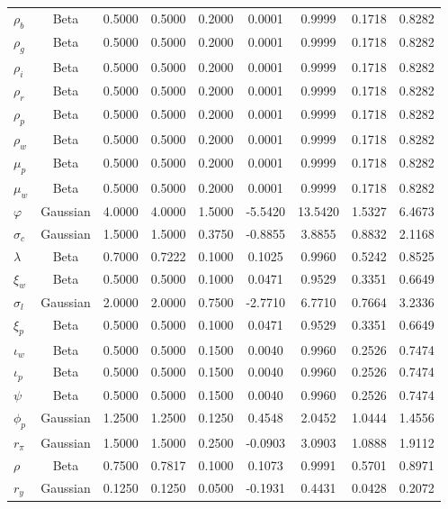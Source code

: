 \begin{center}
\begin{longtable}{lcccccccc}
$ {\rho_b} $ & Beta & 0.5000 & 0.5000 & 0.2000 & 0.0001 & 0.9999 & 0.1718 & 0.8282 \\ 
$ {\rho_g} $ & Beta & 0.5000 & 0.5000 & 0.2000 & 0.0001 & 0.9999 & 0.1718 & 0.8282 \\ 
$ {\rho_i} $ & Beta & 0.5000 & 0.5000 & 0.2000 & 0.0001 & 0.9999 & 0.1718 & 0.8282 \\ 
$ {\rho_r} $ & Beta & 0.5000 & 0.5000 & 0.2000 & 0.0001 & 0.9999 & 0.1718 & 0.8282 \\ 
$ {\rho_p} $ & Beta & 0.5000 & 0.5000 & 0.2000 & 0.0001 & 0.9999 & 0.1718 & 0.8282 \\ 
$ {\rho_w} $ & Beta & 0.5000 & 0.5000 & 0.2000 & 0.0001 & 0.9999 & 0.1718 & 0.8282 \\ 
$ {\mu_p} $ & Beta & 0.5000 & 0.5000 & 0.2000 & 0.0001 & 0.9999 & 0.1718 & 0.8282 \\ 
$ {\mu_w} $ & Beta & 0.5000 & 0.5000 & 0.2000 & 0.0001 & 0.9999 & 0.1718 & 0.8282 \\ 
$ {\varphi} $ & Gaussian & 4.0000 & 4.0000 & 1.5000 & -5.5420 & 13.5420 & 1.5327 & 6.4673 \\ 
$ {\sigma_c} $ & Gaussian & 1.5000 & 1.5000 & 0.3750 & -0.8855 & 3.8855 & 0.8832 & 2.1168 \\ 
$ {\lambda} $ & Beta & 0.7000 & 0.7222 & 0.1000 & 0.1025 & 0.9960 & 0.5242 & 0.8525 \\ 
$ {\xi_w} $ & Beta & 0.5000 & 0.5000 & 0.1000 & 0.0471 & 0.9529 & 0.3351 & 0.6649 \\ 
$ {\sigma_l} $ & Gaussian & 2.0000 & 2.0000 & 0.7500 & -2.7710 & 6.7710 & 0.7664 & 3.2336 \\ 
$ {\xi_p} $ & Beta & 0.5000 & 0.5000 & 0.1000 & 0.0471 & 0.9529 & 0.3351 & 0.6649 \\ 
$ {\iota_w} $ & Beta & 0.5000 & 0.5000 & 0.1500 & 0.0040 & 0.9960 & 0.2526 & 0.7474 \\ 
$ {\iota_p} $ & Beta & 0.5000 & 0.5000 & 0.1500 & 0.0040 & 0.9960 & 0.2526 & 0.7474 \\ 
$ {\psi} $ & Beta & 0.5000 & 0.5000 & 0.1500 & 0.0040 & 0.9960 & 0.2526 & 0.7474 \\ 
$ {\phi_p} $ & Gaussian & 1.2500 & 1.2500 & 0.1250 & 0.4548 & 2.0452 & 1.0444 & 1.4556 \\ 
$ {r_{\pi}} $ & Gaussian & 1.5000 & 1.5000 & 0.2500 & -0.0903 & 3.0903 & 1.0888 & 1.9112 \\ 
$ {\rho} $ & Beta & 0.7500 & 0.7817 & 0.1000 & 0.1073 & 0.9991 & 0.5701 & 0.8971 \\ 
$ {r_{y}} $ & Gaussian & 0.1250 & 0.1250 & 0.0500 & -0.1931 & 0.4431 & 0.0428 & 0.2072 \\ 

\end{longtable}
\end{center}
